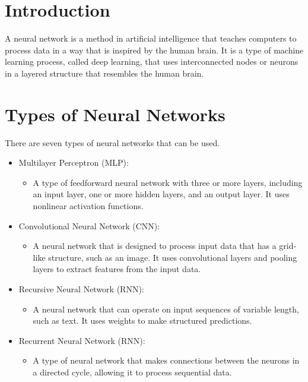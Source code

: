 \section{Introduction}
    A neural network is a method in artificial intelligence that teaches computers to process data in a way that is inspired by the human brain. It is a type of machine learning process, called deep learning, that uses interconnected nodes or neurons in a layered structure that resembles the human brain.

\section{Types of Neural Networks}
    There are seven types of neural networks that can be used.
    \begin{itemize}
        \item Multilayer Perceptron (MLP): 
            \begin{itemize}
                \item A type of feedforward neural network with three or more layers, including an input layer, one or more hidden layers, and an output layer. It uses nonlinear activation functions.
            \end{itemize}
        \item Convolutional Neural Network (CNN): 
            \begin{itemize}
                \item A neural network that is designed to process input data that has a grid-like structure, such as an image. It uses convolutional layers and pooling layers to extract features from the input data.
            \end{itemize}
        \item Recursive Neural Network (RNN): 
            \begin{itemize}
                \item A neural network that can operate on input sequences of variable length, such as text. It uses weights to make structured predictions.
            \end{itemize}
        \item Recurrent Neural Network (RNN): 
            \begin{itemize}
                \item A type of neural network that makes connections between the neurons in a directed cycle, allowing it to process sequential data.
            \end{itemize}

\end{itemize}

